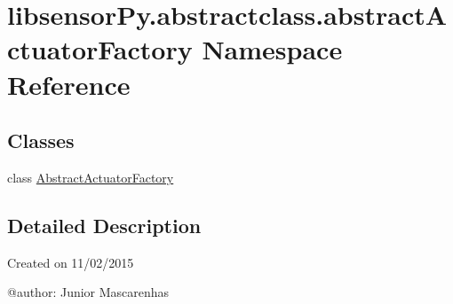 \hypertarget{namespacelibsensorPy_1_1abstractclass_1_1abstractActuatorFactory}{}\section{libsensor\+Py.\+abstractclass.\+abstract\+Actuator\+Factory Namespace Reference}
\label{namespacelibsensorPy_1_1abstractclass_1_1abstractActuatorFactory}
\subsection*{Classes}
\begin{DoxyCompactItemize}
\item 
class \hyperlink{classlibsensorPy_1_1abstractclass_1_1abstractActuatorFactory_1_1AbstractActuatorFactory}{Abstract\+Actuator\+Factory}
\end{DoxyCompactItemize}


\subsection{Detailed Description}
\begin{DoxyVerb}Created on 11/02/2015

@author: Junior Mascarenhas
\end{DoxyVerb}
 